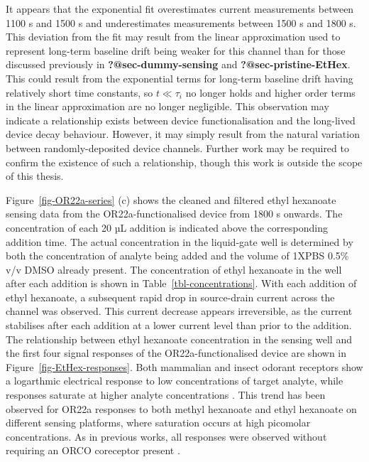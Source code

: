 \documentclass[
  a4paper,
]{scrbook}
\begin{document}
It appears that the exponential fit overestimates current measurements
between 1100 s and 1500 s and underestimates measurements between 1500 s
and 1800 s. This deviation from the fit may result from the linear
approximation used to represent long-term baseline drift being weaker
for this channel than for those discussed previously in
\textbf{?@sec-dummy-sensing} and \textbf{?@sec-pristine-EtHex}. This
could result from the exponential terms for long-term baseline drift
having relatively short time constants, so \(t\ll\tau_i\) no longer
holds and higher order terms in the linear approximation are no longer
negligible. This observation may indicate a relationship exists between
device functionalisation and the long-lived device decay behaviour.
However, it may simply result from the natural variation between
randomly-deposited device channels. Further work may be required to
confirm the existence of such a relationship, though this work is
outside the scope of this thesis.

Figure~\ref{fig-OR22a-series} (c) shows the cleaned and filtered ethyl
hexanoate sensing data from the OR22a-functionalised device from 1800 s
onwards. The concentration of each 20 µL addition is indicated above the
corresponding addition time. The actual concentration in the liquid-gate
well is determined by both the concentration of analyte being added and
the volume of 1XPBS 0.5\% v/v DMSO already present. The concentration of
ethyl hexanoate in the well after each addition is shown in
Table~\ref{tbl-concentrations}. With each addition of ethyl hexanoate, a
subsequent rapid drop in source-drain current across the channel was
observed. This current decrease appears irreversible, as the current
stabilises after each addition at a lower current level than prior to
the addition. The relationship between ethyl hexanoate concentration in
the sensing well and the first four signal responses of the
OR22a-functionalised device are shown in
Figure~\ref{fig-EtHex-responses}. Both mammalian and insect odorant
receptors show a logarthmic electrical response to low concentrations of
target analyte, while responses saturate at higher analyte
concentrations
\autocite{Persaud1982,Khadka2019,Murugathas2020,Cheema2021}. This trend
has been observed for OR22a responses to both methyl hexanoate and ethyl
hexanoate on different sensing platforms, where saturation occurs at
high picomolar concentrations. As in previous works, all responses were
observed without requiring an ORCO coreceptor present
\autocite{Murugathas2019a,Murugathas2020,Khadka2019,Cheema2021}.
\end{document}
